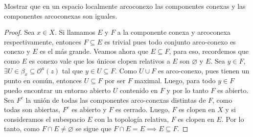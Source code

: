 \documentclass{article}
\theoremstyle{definition}
\newenvironment{ejercicio}[1]{\begin{trivlist}
\item[\hskip \labelsep {\bfseries Ejercicio}\hskip \labelsep {\bfseries #1.}]}{\end{trivlist}}
\begin{document}
\begin{ejercicio}{9}
    Mostrar que en un espacio localmente arcoconexo las componentes conexas y las componentes arcoconexas son iguales.
\end{ejercicio}
\begin{proof}
    Sea \( x \in X \). Si llamamos \( E \) y \( F \) a la componente conexa y arcoconexa respectivamente, entonces \( F \subseteq E \) es trivial pues todo conjunto arco-conexo es conexo y \( E \) es el más grande.
    Veamos ahora que \( E \subseteq F \), para eso, recordemos que como \( E \) es conexo vale que los únicos clopen relativos a \( E \) son \( \varnothing \) y \( E \).
    Sea \( y \in F \), \( \exists U \in \beta_x \subseteq \mathcal{O}^a(z) \) tal que \( y \in U \subseteq F \). Como \( U \cup F \) es arco-conexo, pues tienen un punto en común, entonces \( U \subseteq F \) por ser
    \( F \) maximal. Luego, para todo \( y \in F \) puedo encontrar un entorno abierto \( U \) contenido en \( F \) y por lo tanto \( F \) es abierto. Sea \( F^c \) la unión de todas las componentes arco-conexas distintas de \( F \),
    como todas son abiertas, \( F^c \) es abierto y \( F \) es cerrado. Luego, \( F \) es clopen en \( X \) y si consideramos el subespacio \( E \) con la topología relativa, \( F \) es clopen en \( E \).
    Por lo tanto, como \( F \cap E \neq \varnothing \) se sigue que \( F \cap E = E \implies E \subseteq F \).
\end{proof}
\end{document}
